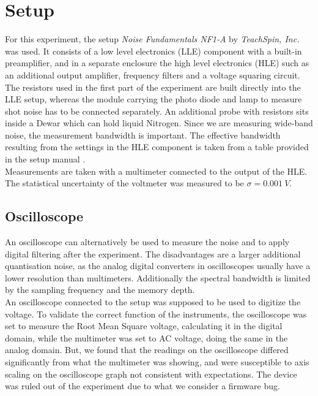 \documentclass[
    parskip=half, 
    twoside=false,
    twocolumn=true,
    fontsize=11pt,
]{scrarticle}
\begin{document}
\section{Setup}
For this experiment, the setup \textit{Noise Fundamentals NF1-A} by \textit{TeachSpin, Inc.} was used. It consists of a low level electronics (LLE) component with a built-in preamplifier, and in a separate enclosure the high level electronics (HLE) such as an additional output amplifier, frequency filters and a voltage squaring circuit.\\
The resistors used in the first part of the experiment are built directly into the LLE setup, whereas the module carrying the photo diode and lamp to measure shot noise has to be connected separately. An additional probe with resistors sits inside a Dewar which can hold liquid Nitrogen. Since we are measuring wide-band noise, the measurement bandwidth is important. The effective bandwidth resulting from the settings in the HLE component is taken from a table provided in the setup manual \autocite{instructions}.\\
Measurements are taken with a multimeter connected to the output of the HLE. The statistical uncertainty of the voltmeter was measured to be $\sigma = \SI{0.001}{V}$.

\subsection*{Oscilloscope}
An oscilloscope can alternatively be used to measure the noise and to apply digital filtering after the experiment.
The disadvantages are a larger additional quantisation noise, as the analog digital converters in oscilloscopes usually have a lower resolution than multimeters.
Additionally the spectral bandwidth is limited by the sampling frequency and the memory depth.\\
An oscilloscope connected to the setup was supposed to be used to digitize the voltage.
To validate the correct function of the instruments, the oscilloscope was set to measure the Root Mean Square voltage, calculating it in the digital domain, while the multimeter was set to AC voltage, doing the same in the analog domain.
But, we found that the readings on the oscilloscope differed significantly from what the multimeter was showing, and were susceptible to axis scaling on the oscilloscope graph not consistent with expectations.
The device was ruled out of the experiment due to what we consider a firmware bug.
\end{document}

